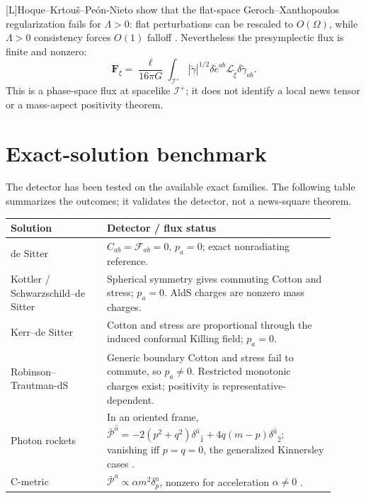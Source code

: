 \documentclass[11pt,a4paper]{article}
\newcommand{\scri}{\mathscr{I}}
\newcommand{\cF}{\mathcal{F}}
\newcommand{\cP}{\mathcal{P}}
\newcommand{\cL}{\mathcal{L}}
\newcommand{\statusL}{\textsf{[L]}}
\begin{document}
\statusL Hoque--Krtou{\v{s}}--Pe{\'o}n-Nieto show that the flat-space Geroch--Xanthopoulos regularization fails for \(\Lambda>0\): flat perturbations can be rescaled to \(O(\Omega)\), while \(\Lambda>0\) consistency forces \(O(1)\) falloff \cite{hoque2025conformal}.  Nevertheless the presymplectic flux is finite and nonzero:
\begin{equation}
  \bm F_\xi
  =
  \frac{\ell}{16\pi G}
  \int_{\scri^+}
  |\tilde\gamma|^{1/2}
  \delta\tilde e^{ab}
  \cL_{\tilde\xi}\delta\tilde\gamma_{ab}.
\end{equation}
This is a phase-space flux at spacelike \(\scri^+\); it does not identify a local news tensor or a mass-aspect positivity theorem.

\section{Exact-solution benchmark}

The detector has been tested on the available exact families.  The following table summarizes the outcomes; it validates the detector, not a news-square theorem.

\begin{center}
\begin{tabular}{p{0.27\linewidth}p{0.64\linewidth}}
\hline
Solution & Detector / flux status\\
\hline
de Sitter & \(C_{ab}=\cF_{ab}=0\), \(p_a=0\); exact nonradiating reference.\\[1mm]
Kottler / Schwarzschild--de Sitter & Spherical symmetry gives commuting Cotton and stress; \(p_a=0\).  AldS charges are nonzero mass charges.\\[1mm]
Kerr--de Sitter & Cotton and stress are proportional through the induced conformal Killing field; \(p_a=0\).\\[1mm]
Robinson--Trautman-dS & Generic boundary Cotton and stress fail to commute, so \(p_a\neq0\).  Restricted monotonic charges exist; positivity is representative-dependent.\\[1mm]
Photon rockets & In an oriented frame,
\(\bar{\cP}^{\hat a}=-2(p^2+q^2)\delta^{\hat a}{}_{\hat1}+4q(m-p)\delta^{\hat a}{}_{\hat2}\);
vanishing iff \(p=q=0\), the generalized Kinnersley cases \cite{fabSen2026rockets}.\\[1mm]
C-metric & \(\bar{\cP}^a\propto\alpha m^2\delta^a_p\), nonzero for acceleration \(\alpha\neq0\) \cite{fabSen2020radiation}.\\[1mm]
\hline
\end{tabular}
\end{center}
\end{document}
